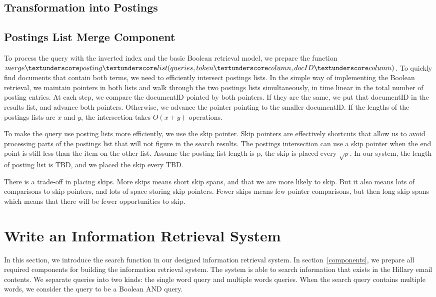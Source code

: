 \documentclass[journal]{IEEEtran}
\begin{document}
\subsection{Transformation into Postings}

\subsection{Postings List Merge Component}
To process the query with the inverted index and the basic Boolean retrieval model, we prepare the function $merge \textunderscore posting \textunderscore list(queries, token \textunderscore column, docID \textunderscore column)$. To quickly find documents that contain both terms, we need to efficiently intersect postings lists. In the simple way of implementing the Boolean retrieval, we maintain pointers in both lists and walk through the two postings lists simultaneously, in time linear in the total number of posting entries. At each step, we compare the documentID pointed by both pointers. If they are the same, we put that documentID in the results list, and advance both pointers. Otherwise, we advance the pointer pointing to the smaller documentID. If the lengths of the postings lists are $x$ and $y$, the intersection takes $O(x+y)$ operations.

To make the query use posting lists more efficiently, we use the skip pointer. Skip pointers are effectively shortcuts that allow us to avoid processing parts of the postings list that will not figure in the search results. The postings intersection can use a skip pointer when the end point is still less than the item on the other list. Assume the posting list length is p, the skip is placed every $\sqrt{p}$. In our system, the length of posting list is TBD, and we placed the skip every TBD. 

There is a trade-off in placing skips. More skips means short skip spans, and that we are more likely to skip. But it also means lots of comparisons to skip pointers, and lots of space storing skip pointers. Fewer skips means few pointer comparisons, but then long skip spans which means that there will be fewer opportunities to skip.

\section{Write an Information Retrieval System}\label{system}
In this section, we introduce the search function in our designed information retrieval system. In section~\ref{components}, we prepare all required components for building the information retrieval system. The system is able to search information that exists in the Hillary email contents. We separate queries into two kinds: the single word query and multiple words queries. When the search query contains multiple words, we consider the query to be a Boolean AND query.
\end{document}
